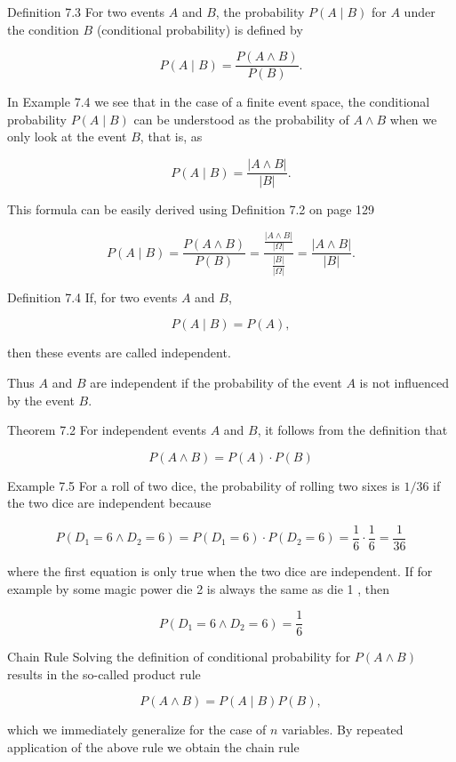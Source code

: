 \documentclass[10pt]{book}
\begin{document}
Definition 7.3 For two events $A$ and $B$, the probability $P(A \mid B)$ for $A$ under the condition $B$ (conditional probability) is defined by

$$
P(A \mid B)=\frac{P(A \wedge B)}{P(B)} .
$$

In Example 7.4 we see that in the case of a finite event space, the conditional probability $P(A \mid B)$ can be understood as the probability of $A \wedge B$ when we only look at the event $B$, that is, as

$$
P(A \mid B)=\frac{|A \wedge B|}{|B|} .
$$

This formula can be easily derived using Definition 7.2 on page 129

$$
P(A \mid B)=\frac{P(A \wedge B)}{P(B)}=\frac{\frac{|A \wedge B|}{|\Omega|}}{\frac{|B|}{|\Omega|}}=\frac{|A \wedge B|}{|B|} .
$$

Definition 7.4 If, for two events $A$ and $B$,

$$
P(A \mid B)=P(A),
$$

then these events are called independent.

Thus $A$ and $B$ are independent if the probability of the event $A$ is not influenced by the event $B$.

Theorem 7.2 For independent events $A$ and $B$, it follows from the definition that

$$
P(A \wedge B)=P(A) \cdot P(B)
$$

Example 7.5 For a roll of two dice, the probability of rolling two sixes is $1 / 36$ if the two dice are independent because

$$
P\left(D_{1}=6 \wedge D_{2}=6\right)=P\left(D_{1}=6\right) \cdot P\left(D_{2}=6\right)=\frac{1}{6} \cdot \frac{1}{6}=\frac{1}{36}
$$

where the first equation is only true when the two dice are independent. If for example by some magic power die 2 is always the same as die 1 , then

$$
P\left(D_{1}=6 \wedge D_{2}=6\right)=\frac{1}{6}
$$

Chain Rule
Solving the definition of conditional probability for $P(A \wedge B)$ results in the so-called product rule

$$
P(A \wedge B)=P(A \mid B) P(B),
$$

which we immediately generalize for the case of $n$ variables. By repeated application of the above rule we obtain the chain rule
\end{document}
